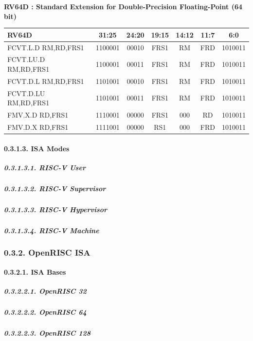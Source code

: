 \documentclass[
]{article}
\begin{document}
\textbf{RV64D : Standard Extension for Double-Precision Floating-Point
(64 bit)}

\begin{longtable}[]{@{}lcccccc@{}}
\toprule
RV64D & 31:25 & 24:20 & 19:15 & 14:12 & 11:7 & 6:0\tabularnewline
\midrule
\endhead
FCVT.L.D RM,RD,FRS1 & 1100001 & 00010 & FRS1 & RM & FRD &
1010011\tabularnewline
FCVT.LU.D RM,RD,FRS1 & 1100001 & 00011 & FRS1 & RM & FRD &
1010011\tabularnewline
FCVT.D.L RM,RD,FRS1 & 1101001 & 00010 & FRS1 & RM & FRD &
1010011\tabularnewline
FCVT.D.LU RM,RD,FRS1 & 1101001 & 00011 & FRS1 & RM & FRD &
1010011\tabularnewline
FMV.X.D RD,FRS1 & 1110001 & 00000 & FRS1 & 000 & RD &
1010011\tabularnewline
FMV.D.X RD,FRS1 & 1111001 & 00000 & RS1 & 000 & FRD &
1010011\tabularnewline
\bottomrule
\end{longtable}

\hypertarget{isa-modes}{%
\paragraph{0.3.1.3. ISA Modes}\label{isa-modes}}

\hypertarget{risc-v-user}{%
\subparagraph{0.3.1.3.1. RISC-V User}\label{risc-v-user}}

\hypertarget{risc-v-supervisor}{%
\subparagraph{0.3.1.3.2. RISC-V Supervisor}\label{risc-v-supervisor}}

\hypertarget{risc-v-hypervisor}{%
\subparagraph{0.3.1.3.3. RISC-V Hypervisor}\label{risc-v-hypervisor}}

\hypertarget{risc-v-machine}{%
\subparagraph{0.3.1.3.4. RISC-V Machine}\label{risc-v-machine}}

\hypertarget{openrisc-isa}{%
\subsubsection{0.3.2. OpenRISC ISA}\label{openrisc-isa}}

\hypertarget{isa-bases-1}{%
\paragraph{0.3.2.1. ISA Bases}\label{isa-bases-1}}

\hypertarget{openrisc-32}{%
\subparagraph{0.3.2.2.1. OpenRISC 32}\label{openrisc-32}}

\hypertarget{openrisc-64}{%
\subparagraph{0.3.2.2.2. OpenRISC 64}\label{openrisc-64}}

\hypertarget{openrisc-128}{%
\subparagraph{0.3.2.2.3. OpenRISC 128}\label{openrisc-128}}
\end{document}
